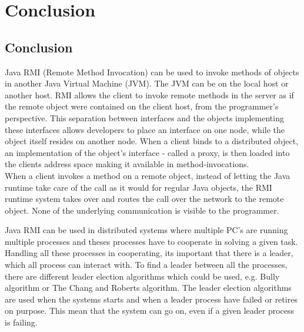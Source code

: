 \documentclass[Main]{subfiles}
\begin{document}
\chapter{Conclusion}

\section{Conclusion}
Java RMI (Remote Method Invocation) can be used to invoke methods of
objects in another Java Virtual Machine (JVM). The JVM can be on the local host or another host. RMI allows the client to invoke remote methods in the server as if the remote object were contained on the client host, from the programmer's perspective. This separation between interfaces and the objects implementing these interfaces allows developers to place an interface on one node, while the object itself resides on another node. When a client binds to a distributed object, an implementation of the object's interface - called a proxy, is then loaded into the clients address space making it available in method-invocations.\\When a client invokes a method on a remote object, instead of letting the Java runtime take care of the call as it would for regular Java objects, the RMI runtime system takes over and routes the call over the network to the remote object. None of the underlying communication is visible to the programmer.


Java RMI can be used in distributed systems where multiple PC's are running multiple processes and theses processes have to cooperate in solving a given task. Handling all these processes in cooperating, its important that there is a leader, which all process can interact with. To find a leader between all the processes, there are different leader election algorithms which could be used, e.g. Bully algorithm or The Chang and Roberts algorithm. The leader election algorithms are used when the systems starts and when a leader process have failed or retires on purpose. This mean that the system can go on, even if a given leader process is failing.
\end{document}
